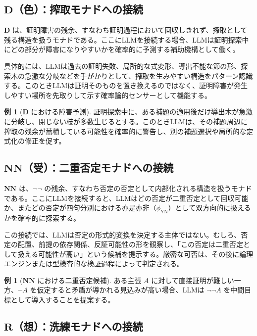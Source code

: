 \documentclass[11pt,a4paper]{ltjsarticle}
\theoremstyle{definition}
\newtheorem{example}[theorem]{例}
\newcommand{\Md}{\mathbf{D}}
\newcommand{\Mnn}{\mathbf{NN}}
\newcommand{\Mr}{\mathbf{R}}
\newcommand{\phiYN}{\phi_{\text{YN}}}
\begin{document}
\subsection{$\Md$（色）：搾取モナドへの接続}

$\Md$ は、証明障害の残余、すなわち証明過程において回収しきれず、搾取として残る構造を扱うモナドである。ここにLLMを接続する場合、LLMは証明探索中にどの部分が障害になりやすいかを確率的に予測する補助機構として働く。

具体的には、LLMは過去の証明失敗、局所的な式変形、導出不能な節の形、探索木の急激な分岐などを手がかりとして、搾取を生みやすい構造をパターン認識する。このときLLMは証明そのものを置き換えるのではなく、証明障害が発生しやすい場所を先取りして示す確率論的センサーとして機能する。

\begin{example}[$\Md$ における障害予測]
証明探索中に、ある補題の適用後だけ導出木が急激に分岐し、閉じない枝が多数生じるとする。このときLLMは、その補題周辺に搾取の残余が蓄積している可能性を確率的に警告し、別の補題選択や局所的な定式化の修正を促す。
\end{example}

\subsection{$\Mnn$（受）：二重否定モナドへの接続}

$\Mnn$ は、$\neg\neg$ の残余、すなわち否定の否定として内部化される構造を扱うモナドである。ここにLLMを接続すると、LLMはどの否定が二重否定として回収可能か、またどの否定が四句分別における亦是亦非（$\phiYN$）として双方向的に扱えるかを確率的に探索する。

この接続では、LLMは否定の形式的変換を決定する主体ではない。むしろ、否定の配置、前提の依存関係、反証可能性の形を観察し、「この否定は二重否定として扱える可能性が高い」という候補を提示する。厳密な可否は、その後に論理エンジンまたは型検査的な検証過程によって判定される。

\begin{example}[$\Mnn$ における二重否定候補]
ある主張 $A$ に対して直接証明が難しい一方、$\neg A$ を仮定すると矛盾が導かれる見込みが高い場合、LLMは $\neg\neg A$ を中間目標として導入することを提案する。
\end{example}

\subsection{$\Mr$（想）：洗練モナドへの接続}
\end{document}
